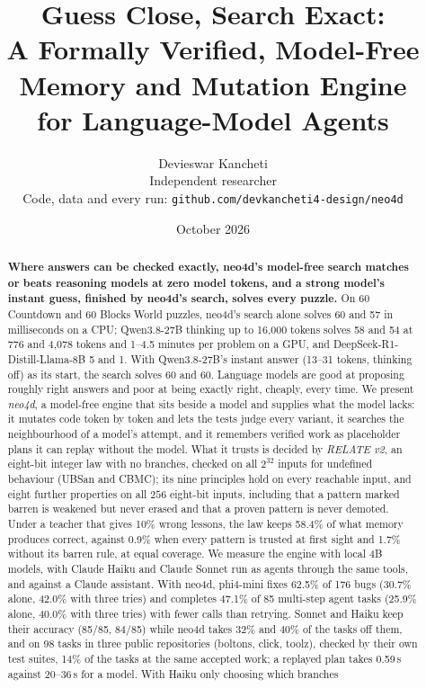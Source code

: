 \documentclass[10pt]{article}
\title{\textbf{Guess Close, Search Exact:}\\ A Formally Verified, Model-Free Memory and Mutation Engine\\ for Language-Model Agents}
\author{Devieswar Kancheti\\ Independent researcher\\ \small Code, data and every run: \texttt{github.com/devkancheti4-design/neo4d}}
\date{October 2026}
\begin{document}
\maketitle

\begin{abstract}
\textbf{Where answers can be checked exactly, neo4d's model-free search matches or beats reasoning models at zero
model tokens, and a strong model's instant guess, finished by neo4d's search, solves every puzzle.} On 60 Countdown
and 60 Blocks World puzzles, neo4d's search alone solves 60 and 57 in milliseconds on a CPU; Qwen3.8-27B thinking up to
16{,}000 tokens solves 58 and 54 at 776 and 4{,}078 tokens and 1--4.5 minutes per problem on a GPU, and
DeepSeek-R1-Distill-Llama-8B 5 and 1. With Qwen3.8-27B's instant answer (13--31 tokens, thinking off) as its start,
the search solves 60 and 60.
Language models are good at proposing roughly right answers and poor at being exactly right, cheaply, every time.
We present \emph{neo4d}, a model-free engine that sits beside a model and supplies what the model lacks: it mutates
code token by token and lets the tests judge every variant, it searches the neighbourhood of a model's attempt, and it
remembers verified work as placeholder plans it can replay without the model. What it trusts is decided by
\emph{RELATE v2}, an eight-bit integer law with no branches, checked on all $2^{32}$ inputs for undefined behaviour
(UBSan and CBMC); its nine principles hold on every reachable input, and eight further properties on all $256$
eight-bit inputs, including that a pattern marked barren is weakened but never erased and that a proven pattern is
never demoted. Under a teacher that gives 10\% wrong lessons, the law keeps 58.4\% of what memory
produces correct, against 0.9\% when every pattern is trusted at first sight and 1.7\% without its barren rule, at
equal coverage. We measure the engine with local 4B models, with Claude Haiku and Claude Sonnet run as agents through
the same tools, and against a Claude assistant. With neo4d, phi4-mini fixes 62.5\% of 176 bugs (30.7\% alone, 42.0\%
with three tries) and completes 47.1\% of 85 multi-step agent tasks (25.9\% alone, 40.0\% with three tries) with
fewer calls than retrying. Sonnet and Haiku keep their accuracy (85/85, 84/85) while neo4d takes 32\% and 40\% of the
tasks off them, and on 98 tasks in three public repositories (boltons, click, toolz), checked by their own test
suites, 14\% of the tasks at the same accepted work; a replayed plan takes 0.59\,s against 20--36\,s for a model. With Haiku only choosing which branches

\end{abstract}
\end{document}

